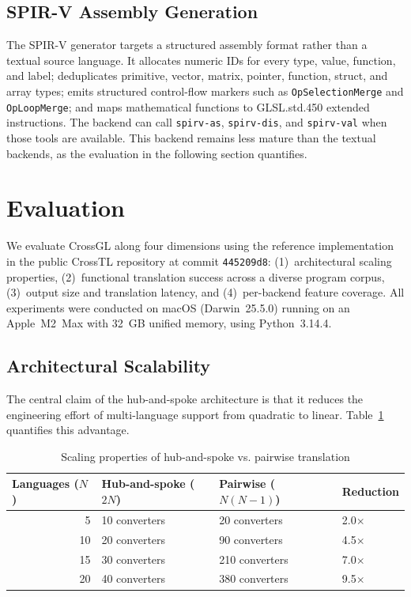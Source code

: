 \documentclass{svproc}
\begin{document}
\subsection{SPIR-V Assembly Generation}

The SPIR-V generator targets a structured assembly format rather than a textual source language. It allocates numeric IDs for every type, value, function, and label; deduplicates primitive, vector, matrix, pointer, function, struct, and array types; emits structured control-flow markers such as \texttt{OpSelectionMerge} and \texttt{OpLoopMerge}; and maps mathematical functions to GLSL.std.450 extended instructions. The backend can call \texttt{spirv-as}, \texttt{spirv-dis}, and \texttt{spirv-val} when those tools are available. This backend remains less mature than the textual backends, as the evaluation in the following section quantifies.

\section{Evaluation}

We evaluate CrossGL along four dimensions using the reference implementation in the public CrossTL repository at commit \texttt{445209d8}: (1)~architectural scaling properties, (2)~functional translation success across a diverse program corpus, (3)~output size and translation latency, and (4)~per-backend feature coverage. All experiments were conducted on macOS (Darwin~25.5.0) running on an Apple~M2~Max with 32~GB unified memory, using Python~3.14.4.

\subsection{Architectural Scalability}

The central claim of the hub-and-spoke architecture is that it reduces the engineering effort of multi-language support from quadratic to linear. Table~\ref{tab:complexity} quantifies this advantage.

\begin{table}
\caption{Scaling properties of hub-and-spoke vs. pairwise translation}
\label{tab:complexity}
\begin{center}
\begin{tabular}{r@{\quad}lll}
\hline
\multicolumn{1}{l}{\rule{0pt}{12pt}\textbf{Languages ($N$)}} & \textbf{Hub-and-spoke ($2N$)} & \textbf{Pairwise ($N(N-1)$)} & \textbf{Reduction} \\[2pt]
\hline\rule{0pt}{12pt}
5 & 10 converters & 20 converters & 2.0$\times$ \\
10 & 20 converters & 90 converters & 4.5$\times$ \\
15 & 30 converters & 210 converters & 7.0$\times$ \\
20 & 40 converters & 380 converters & 9.5$\times$ \\[2pt]
\hline
\end{tabular}
\end{center}
\end{table}
\end{document}
